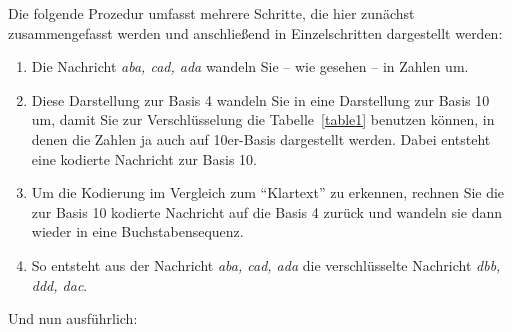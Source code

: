 \documentclass[a4paper,11pt, oneside,openright,titlepage,dvips]{scrbook}
\begin{document}
\clearpage

Die folgende Prozedur umfasst mehrere Schritte, die hier zunächst 
zusammengefasst werden und anschließend in Einzelschritten dargestellt
werden:

\begin{enumerate}
\item Die Nachricht \emph{aba, cad, ada} wandeln Sie -- wie gesehen -- in
  Zahlen um.
\item Diese Darstellung zur Basis 4 wandeln Sie in eine Darstellung
  zur Basis 10 um, damit Sie zur Verschlüsselung die
  Tabelle~\ref{table1}
  benutzen können, in denen die Zahlen ja auch auf 10er-Basis
  dargestellt werden.  Dabei entsteht eine kodierte Nachricht zur
  Basis 10.

\item Um die Kodierung im Vergleich zum "`Klartext"' zu erkennen,
  rechnen Sie die zur Basis 10 kodierte Nachricht auf die Basis 4
  zurück und wandeln sie dann wieder in eine Buchstabensequenz.

\item So entsteht aus der Nachricht \emph{aba, cad, ada} die verschlüsselte
  Nachricht \emph{dbb, ddd, dac}.
\end{enumerate}


\clearpage

Und nun ausführlich:
\end{document}
